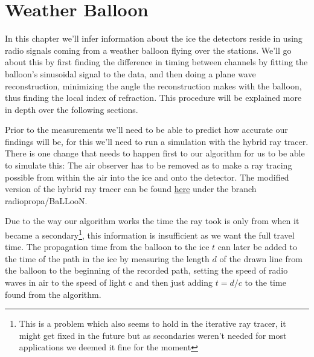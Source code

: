 \chapter{Weather Balloon}
\label{chap:WB}
In this chapter we'll infer information about the ice the detectors reside in
using radio signals coming from a weather balloon flying over the stations. 
We'll go about this by first finding the difference in timing between  
channels by fitting the balloon's sinusoidal signal to the data, and
then doing a plane wave reconstruction, minimizing the angle the reconstruction
makes with the balloon, thus finding the local index of refraction.
This procedure will be explained more in depth over the following sections.

Prior to the measurements we'll need to be able to predict how accurate our
findings will be, for this we'll need to run a simulation with the hybrid ray
tracer.  There is one change that needs to happen first to our algorithm for us
to be able to simulate this: The air observer has to be removed as to make a
ray tracing possible from within the air into the ice and onto the detector.
The modified version of the hybrid ray tracer can be found
\href{https://github.com/arthuradriaens-code/NuRadioMC.git}{here} under the
branch radiopropa/BaLLooN.

Due to the way our algorithm works the time the ray took is only from when it
became a secondary\footnote{This is a problem which also seems to hold in the 
iterative ray tracer, it might get fixed in the future but as
secondaries weren't needed for most applications we deemed it fine for the
moment}, this information is insufficient as we want the full travel time.  The
propagation time from the balloon to the ice $t$ can later be added to the time
of the path in the ice by measuring the length $d$ of the drawn line from the
balloon to the beginning of the recorded path, setting the speed of radio waves
in air to the speed of light c and then just adding $t = d/c$ to the time found
from the algorithm.
